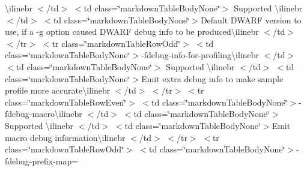 \begin{longtabu}
{\ttfamily \textbackslash{}ilinebr \texorpdfstring{$<$}{<}/td\texorpdfstring{$>$}{>} \texorpdfstring{$<$}{<}td class=\char`\"{}markdown\+Table\+Body\+None\char`\"{}\texorpdfstring{$>$}{>} Supported \textbackslash{}ilinebr \texorpdfstring{$<$}{<}/td\texorpdfstring{$>$}{>} \texorpdfstring{$<$}{<}td class=\char`\"{}markdown\+Table\+Body\+None\char`\"{}\texorpdfstring{$>$}{>}}Default DWARF version to use, if a -\/g option caused DWARF debug info to be produced{\ttfamily \textbackslash{}ilinebr \texorpdfstring{$<$}{<}/td\texorpdfstring{$>$}{>} \texorpdfstring{$<$}{<}/tr\texorpdfstring{$>$}{>} \texorpdfstring{$<$}{<}tr class=\char`\"{}markdown\+Table\+Row\+Odd\char`\"{}\texorpdfstring{$>$}{>} \texorpdfstring{$<$}{<}td class=\char`\"{}markdown\+Table\+Body\+None\char`\"{}\texorpdfstring{$>$}{>}}-\/fdebug-\/info-\/for-\/profiling{\ttfamily \textbackslash{}ilinebr \texorpdfstring{$<$}{<}/td\texorpdfstring{$>$}{>} \texorpdfstring{$<$}{<}td class=\char`\"{}markdown\+Table\+Body\+None\char`\"{}\texorpdfstring{$>$}{>} Supported \textbackslash{}ilinebr \texorpdfstring{$<$}{<}/td\texorpdfstring{$>$}{>} \texorpdfstring{$<$}{<}td class=\char`\"{}markdown\+Table\+Body\+None\char`\"{}\texorpdfstring{$>$}{>}}Emit extra debug info to make sample profile more accurate{\ttfamily \textbackslash{}ilinebr \texorpdfstring{$<$}{<}/td\texorpdfstring{$>$}{>} \texorpdfstring{$<$}{<}/tr\texorpdfstring{$>$}{>} \texorpdfstring{$<$}{<}tr class=\char`\"{}markdown\+Table\+Row\+Even\char`\"{}\texorpdfstring{$>$}{>} \texorpdfstring{$<$}{<}td class=\char`\"{}markdown\+Table\+Body\+None\char`\"{}\texorpdfstring{$>$}{>}}-\/fdebug-\/macro{\ttfamily \textbackslash{}ilinebr \texorpdfstring{$<$}{<}/td\texorpdfstring{$>$}{>} \texorpdfstring{$<$}{<}td class=\char`\"{}markdown\+Table\+Body\+None\char`\"{}\texorpdfstring{$>$}{>} Supported \textbackslash{}ilinebr \texorpdfstring{$<$}{<}/td\texorpdfstring{$>$}{>} \texorpdfstring{$<$}{<}td class=\char`\"{}markdown\+Table\+Body\+None\char`\"{}\texorpdfstring{$>$}{>}}Emit macro debug information{\ttfamily \textbackslash{}ilinebr \texorpdfstring{$<$}{<}/td\texorpdfstring{$>$}{>} \texorpdfstring{$<$}{<}/tr\texorpdfstring{$>$}{>} \texorpdfstring{$<$}{<}tr class=\char`\"{}markdown\+Table\+Row\+Odd\char`\"{}\texorpdfstring{$>$}{>} \texorpdfstring{$<$}{<}td class=\char`\"{}markdown\+Table\+Body\+None\char`\"{}\texorpdfstring{$>$}{>}}-\/fdebug-\/prefix-\/map=


\end{longtabu}

